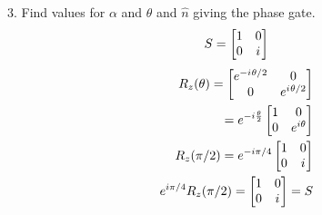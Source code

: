 \documentclass[12pt, letterpaper, twoside]{article}
\newcommand{\iu}{{i\mkern1mu}}
\newcommand{\Rz}{\begin{bmatrix}
        e^{-\iu\theta/2} & 0 \\
        0 & e^{\iu\theta/2}
    \end{bmatrix}}
\newcommand{\halftheta}{\frac{\theta}{2}}
\newcommand{\twoXtwo}[4]{\begin{bmatrix}
    #1 & #3 \\
    #2 & #4
\end{bmatrix}}
\begin{document}
3. Find values for $\alpha$ and $\theta$ and $\hat{n}$ giving the phase gate.
$$
S = \twoXtwo{1}{0}{0}{\iu}
$$
\begin{subequations}
\begin{align}
R_z(\theta) = \Rz\\
= e^{-i \halftheta} \twoXtwo{1}{0}{0}{e^{i \theta} } \\
R_z(\pi/2) = e^{-i \pi/4} \twoXtwo{1}{0}{0}{i} \\
e^{i \pi/4}R_z(\pi/2) = \twoXtwo{1}{0}{0}{\iu} = S \\
\end{align}
\end{subequations}
\end{document}
